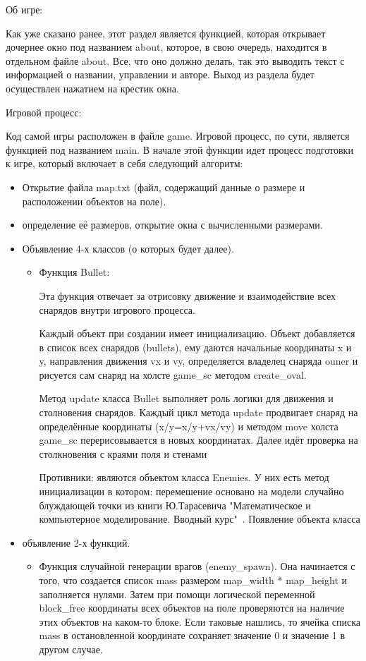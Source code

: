 Об игре:

Как уже сказано ранее, этот раздел является функцией, которая открывает дочернее окно под названием about, которое, в свою очередь, находится в отдельном файле about. Все, что оно должно делать, так это выводить текст с информацией о названии, управлении и авторе. Выход из раздела будет осуществлен нажатием на крестик окна.

Игровой процесс:

Код самой игры расположен в файле game. Игровой процесс, по сути, является функцией под названием main. В начале этой функции идет процесс подготовки к игре, который включает в себя следующий алгоритм:
\begin{itemize}
\item Открытие файла map.txt (файл, содержащий данные о размере и расположении объектов на поле).
\item определение её размеров, открытие окна с вычисленными размерами.
\item Объявление 4-х классов (о которых будет далее).
    \begin{itemize}
    \item Функция Bullet:

    Эта функция отвечает за отрисовку движение и взаимодействие всех снарядов внутри игрового процесса.
    
    Каждый объект при создании имеет инициализацию. Объект добавляется в список всех снарядов (bullets), ему даются начальные координаты x и y, направления движения vx и vy, определяется владелец снаряда ouner и рисуется сам снаряд на холсте game\_sc методом create\_oval.

    Метод update класса Bullet выполняет роль логики для движения и столновения снарядов. Каждый цикл метода update продвигает снаряд на определённые координаты (x/y=x/y+vx/vy) и методом move холста game\_sc перерисовывается в новых координатах. Далее идёт проверка на столкновения с краями поля и стенами
    
    Противники: являются объектом класса Enemies. У них есть метод инициализации в котором:  перемешение основано на модели случайно блуждающей точки из книги Ю.Тарасевича "Математическое и компьютерное моделирование. Вводный курс"~\cite{book-math-mod}. Появление объекта класса
    \end{itemize}
\item объявление 2-х функций.
    \begin{itemize}
    \item Функция случайной генерации врагов (enemy\_spawn). Она начинается с того, что создается список mass размером map\_width * map\_height и заполняется нулями. Затем при помощи логической переменной block\_free координаты всех объектов на поле проверяются на наличие этих объектов на каком-то блоке. Если таковые нашлись, то ячейка списка mass в остановленной координате сохраняет значение 0 и значение 1 в другом случае.


\end{itemize}
\end{itemize}
